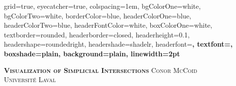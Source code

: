 \documentclass[a0paper,landscape,final]{baposter}
\begin{document}
\begin{poster}{
grid=true,
eyecatcher=true,
colspacing=1em,
bgColorOne=white,
bgColorTwo=white,
borderColor=blue,
headerColorOne=blue,
headerColorTwo=blue,
headerFontColor=white,
boxColorOne=white,
textborder=rounded,
headerborder=closed,
headerheight=0.1\textheight,
headershape=roundedright,
headershade=shadelr,
headerfont=\Large\bf\textsc, %
textfont={\setlength{\parindent}{1.5em}},
boxshade=plain,
background=plain,
linewidth=2pt%
}

{\centering\bf\textsc{Visualization of Simplicial Intersections}\vspace{0.2em}}
{\textsc{Conor McCoid\\ \small{Universit\'e Laval}}} %


\end{poster}
\end{document}
